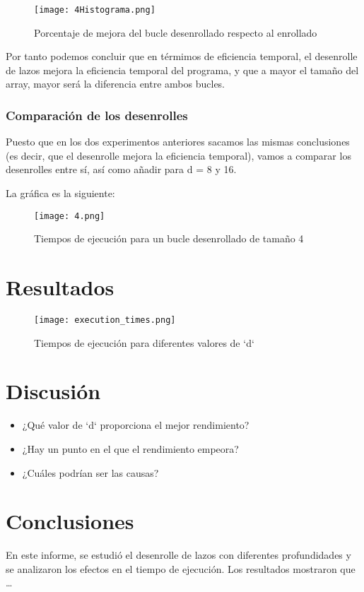 \documentclass[a4paper,twocolumn]{article}
\begin{document}
\begin{figure}[H]
	\centering
	\texttt{[image: 4Histograma.png]}
	\caption{Porcentaje de mejora del bucle desenrollado respecto al enrollado}
	\label{fig:times}
\end{figure}

Por tanto podemos concluir que en térmimos de eficiencia temporal, el desenrolle de lazos mejora la eficiencia temporal del programa, y que a mayor el tamaño del array, mayor será la diferencia entre ambos bucles.

\subsubsection{Comparación de los desenrolles}

Puesto que en los dos experimentos anteriores sacamos las mismas conclusiones (es decir, que el desenrolle mejora la eficiencia temporal), vamos a comparar los desenrolles entre sí, así como añadir para d = 8 y 16.

La gráfica es la siguiente: 

\begin{figure}[H]
	\centering
	\texttt{[image: 4.png]}
	\caption{Tiempos de ejecución para un bucle desenrollado de tamaño 4}
	\label{fig:times}
\end{figure}


\section{Resultados}
\begin{figure}[h]
    \centering
    \texttt{[image: execution\_times.png]}
    \caption{Tiempos de ejecución para diferentes valores de `d`}
    \label{fig:times}
\end{figure}

\section{Discusión}
\begin{itemize}
    \item ¿Qué valor de `d` proporciona el mejor rendimiento?
    \item ¿Hay un punto en el que el rendimiento empeora?
    \item ¿Cuáles podrían ser las causas?
\end{itemize}

\section{Conclusiones}
En este informe, se estudió el desenrolle de lazos con diferentes profundidades y se analizaron los efectos en el tiempo de ejecución. Los resultados mostraron que \ldots
\end{document}
